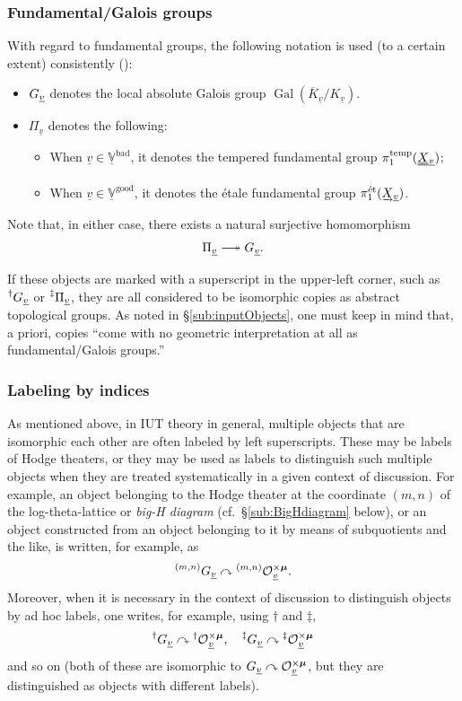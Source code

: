 \documentclass[12pt, reqno, a4paper]{amsart}
\def\udl#1{\underline{#1}} %
\def\uudl#1{\uuline{#1}} %
\def\ovl#1{\overline{#1}} %
\def\acton{\curvearrowright} %
\def\surjlongto{\relbar\joinrel\twoheadrightarrow}
\def\bV{\mathbb{V}}
\def\uV{\udl{\bV}} %
\def\uv{\udl{v}} %
\def\uuX{\uudl{X}{}} %
\def\uaX{\underscriptrightarrow{X}} %
\def\et{\textrm{\'et}}
\def\bad{\mathrm{bad}}
\def\good{\mathrm{good}}
\DeclareMathOperator{\Gal}{Gal}
\DeclareMathOperator{\temp}{temp}
\begin{document}
\subsubsection{Fundamental/Galois groups}
With regard to fundamental groups, the following notation is used (to a certain extent) consistently (\cite[Def.\ 3.1(e), (f), p.\ 70--71]{MR4225473}):
\begin{itemize}
\item[(a)] $\GG_{\uv}$ denotes the local absolute Galois group $\Gal(\ovl{K}_{\uv}/K_{\uv})$.
\item[(b)] $\Pi_{\uv}$ denotes the following: 
\begin{itemize}
\item[(b1)] When $\uv\in\uV^{\bad}$, it denotes the tempered fundamental group $\pi_1^{\temp}(\uuX_{\uv})$;
\item[(b2)] When $\uv\in\uV^{\good}$, it denotes the {\'e}tale fundamental group $\pi^{\et}_1(\uaX_{\uv})$.
\end{itemize}
\end{itemize}

Note that, in either case, there exists a natural surjective homomorphism
$$
\Pi_{\uv}\surjlongto \GG_{\uv}.
$$

If these objects are marked with a superscript in the upper-left corner, such as $\GG[\dag]_{\uv}$ or $\PPi[\ddag]_{\uv}$, they are all considered to be isomorphic copies as abstract topological groups.
As noted in \S\ref{sub:inputObjects}, one must keep in mind that, a priori, copies ``come with no geometric interpretation at all as fundamental/Galois groups.''


\subsubsection{Labeling by indices}
As mentioned above, in IUT theory in general, multiple objects that are isomorphic each other are often labeled by left superscripts.
These may be labels of Hodge theaters, or they may be used as labels to distinguish such multiple objects when they are treated systematically in a given context of discussion.
For example, an object belonging to the Hodge theater at the coordinate $(m,n)$ of the log-theta-lattice or {\it big-H diagram} (cf.\ \S\ref{sub:BigHdiagram} below), or an object constructed from an object belonging to it by means of subquotients and the like, is written, for example, as
\begin{equation*}
  \GG[(m,n)]_{\uv}\acton \OOxmu[(m,n)]_{\uv}.
\end{equation*}
Moreover, when it is necessary in the context of discussion to distinguish objects by ad hoc labels, one writes, for example, using $\dag$ and $\ddag$,
\begin{equation*}
\GG[\dag]_{\uv}\acton\OOxmu[\dag]_{\uv},\quad \GG[\ddag]_{\uv}\acton\OOxmu[\ddag]_{\uv}
\end{equation*}
and so on (both of these are isomorphic to $\GG_{\uv}\acton\OOxmu_{\uv}$, but they are distinguished as objects with different labels).
\end{document}
